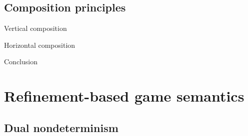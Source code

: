 \documentclass[aspectratio=141]{beamer}
\begin{document}
\subsection{Composition principles}

\begin{frame}{Vertical composition}

\end{frame}

\begin{frame}{Horizontal composition}

\end{frame}

\begin{frame}{Conclusion}

\end{frame}


\section{Refinement-based game semantics} \label{sec:rbgs} %

\subsection{Dual nondeterminism}
\end{document}
